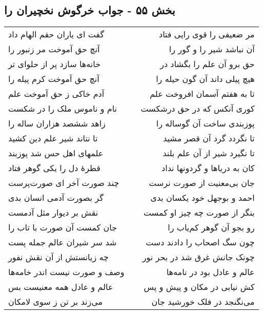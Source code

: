 \begin{center}
\section*{بخش ۵۵ - جواب خرگوش نخچیران را}
\label{sec:sh055}
\begin{longtable}{l p{0.5cm} r}
گفت ای یاران حقم الهام داد
&&
مر ضعیفی را قوی رایی فتاد
\\
آنچ حق آموخت مر زنبور را
&&
آن نباشد شیر را و گور را
\\
خانه‌ها سازد پر از حلوای تر
&&
حق برو آن علم را بگشاد در
\\
آنچ حق آموخت کرم پیله را
&&
هیچ پیلی داند آن گون حیله را
\\
آدم خاکی ز حق آموخت علم
&&
تا به هفتم آسمان افروخت علم
\\
نام و ناموس ملک را در شکست
&&
کوری آنکس که در حق درشکست
\\
زاهد ششصد هزاران ساله را
&&
پوزبندی ساخت آن گوساله را
\\
تا نتاند شیر علم دین کشید
&&
تا نگردد گرد آن قصر مشید
\\
علمهای اهل حس شد پوزبند
&&
تا نگیرد شیر از آن علم بلند
\\
قطرهٔ دل را یکی گوهر فتاد
&&
کان به دریاها و گردونها نداد
\\
چند صورت آخر ای صورت‌پرست
&&
جان بی‌معنیت از صورت نرست
\\
گر بصورت آدمی انسان بدی
&&
احمد و بوجهل خود یکسان بدی
\\
نقش بر دیوار مثل آدمست
&&
بنگر از صورت چه چیز او کمست
\\
جان کمست آن صورت با تاب را
&&
رو بجو آن گوهر کم‌یاب را
\\
شد سر شیران عالم جمله پست
&&
چون سگ اصحاب را دادند دست
\\
چه زیانستش از آن نقش نفور
&&
چونک جانش غرق شد در بحر نور
\\
وصف و صورت نیست اندر خامه‌ها
&&
عالم و عادل بود در نامه‌ها
\\
عالم و عادل همه معنیست بس
&&
کش نیابی در مکان و پیش و پس
\\
می‌زند بر تن ز سوی لامکان
&&
می‌نگنجد در فلک خورشید جان
\\
\end{longtable}
\end{center}
